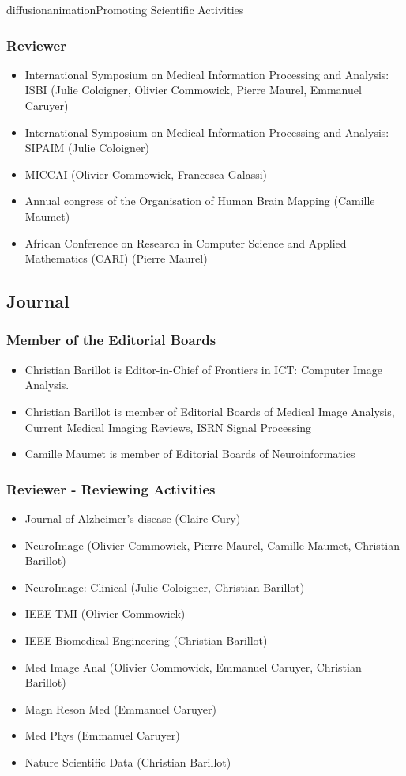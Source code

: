 \documentclass{ra2018}
\begin{document}
\begin{module}{diffusion}{animation}{Promoting Scientific Activities}
    \subsubsection{Reviewer}
    \begin{itemize}
        \item International Symposium on Medical Information Processing and Analysis: ISBI (Julie Coloigner, Olivier Commowick, Pierre Maurel, Emmanuel Caruyer)
	\item International Symposium on Medical Information Processing and Analysis: SIPAIM (Julie Coloigner)
        \item MICCAI (Olivier Commowick, Francesca Galassi)
        \item Annual congress of the Organisation of Human Brain Mapping (Camille Maumet)
        \item African Conference on Research in Computer Science and Applied Mathematics (CARI) (Pierre Maurel)
    \end{itemize}   
\subsection{Journal}
    \subsubsection{Member of the Editorial Boards}
    \begin{itemize}
		\item Christian Barillot is Editor-in-Chief of Frontiers in ICT: Computer Image Analysis.
		\item Christian Barillot is member of Editorial Boards of Medical Image Analysis, Current Medical Imaging Reviews, ISRN Signal Processing
        \item Camille Maumet is member of Editorial Boards of Neuroinformatics
    \end{itemize}   
    \subsubsection{Reviewer - Reviewing Activities}
    \begin{itemize}
        \item Journal of Alzheimer's disease (Claire Cury)
        \item NeuroImage (Olivier Commowick, Pierre Maurel, Camille Maumet, Christian Barillot)
        \item NeuroImage: Clinical (Julie Coloigner, Christian Barillot)
        \item IEEE TMI (Olivier Commowick)
        \item IEEE Biomedical Engineering (Christian Barillot)
        \item Med Image Anal (Olivier Commowick, Emmanuel Caruyer, Christian Barillot)
	\item Magn Reson Med (Emmanuel Caruyer)
	\item Med Phys (Emmanuel Caruyer)
	\item Nature Scientific Data (Christian Barillot)
    \end{itemize}    

\end{module}
\end{document}
